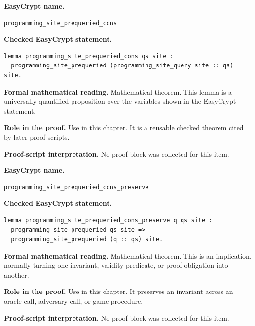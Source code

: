 \begin{formaltheorem}
\noindent\textbf{EasyCrypt name.}
\begin{lstlisting}[language=EasyCrypt,basicstyle=\ttfamily\scriptsize]
programming_site_prequeried_cons
\end{lstlisting}
\noindent\textbf{Checked EasyCrypt statement.}
\begin{lstlisting}[language=EasyCrypt,basicstyle=\ttfamily\scriptsize]
lemma programming_site_prequeried_cons qs site :
  programming_site_prequeried (programming_site_query site :: qs) site.
\end{lstlisting}
\noindent\textbf{Formal mathematical reading.}
Mathematical theorem. This lemma is a universally quantified proposition over the variables shown in the EasyCrypt statement.

\noindent\textbf{Role in the proof.}
Use in this chapter. It is a reusable checked theorem cited by later proof scripts.

\noindent\textbf{Proof-script interpretation.}
No proof block was collected for this item.

\end{formaltheorem}

\begin{formaltheorem}
\noindent\textbf{EasyCrypt name.}
\begin{lstlisting}[language=EasyCrypt,basicstyle=\ttfamily\scriptsize]
programming_site_prequeried_cons_preserve
\end{lstlisting}
\noindent\textbf{Checked EasyCrypt statement.}
\begin{lstlisting}[language=EasyCrypt,basicstyle=\ttfamily\scriptsize]
lemma programming_site_prequeried_cons_preserve q qs site :
  programming_site_prequeried qs site =>
  programming_site_prequeried (q :: qs) site.
\end{lstlisting}
\noindent\textbf{Formal mathematical reading.}
Mathematical theorem. This is an implication, normally turning one invariant, validity predicate, or proof obligation into another.

\noindent\textbf{Role in the proof.}
Use in this chapter. It preserves an invariant across an oracle call, adversary call, or game procedure.

\noindent\textbf{Proof-script interpretation.}
No proof block was collected for this item.

\end{formaltheorem}

